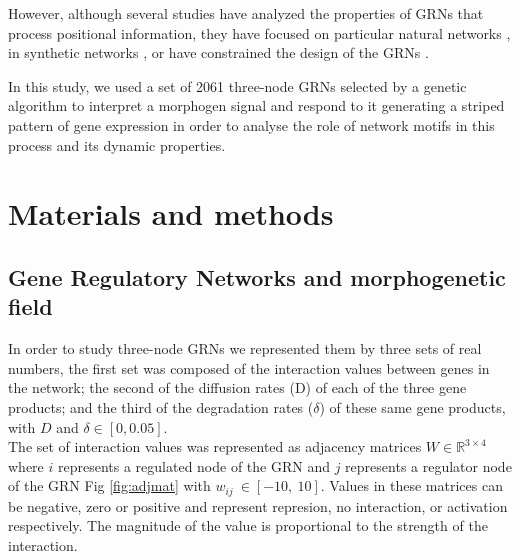 \documentclass[10pt,letterpaper]{article}
\begin{document}
However, although several studies have analyzed the properties of GRNs that
process positional information, they have focused on particular natural networks
\cite{Schaerli2014,Jaeger2004}, in synthetic networks
\cite{Basu2005,Reinitz1995,Schaerli2018}, or have constrained the design of the
GRNs \cite{Elowitz2000}.

In this study, we used a set of 2061 three-node GRNs selected by a genetic
algorithm to interpret a morphogen signal and respond to it generating a
striped pattern of gene expression in order to analyse the role of network 
motifs in this process and its dynamic properties.



\section*{Materials and methods}
\subsection*{Gene Regulatory Networks and morphogenetic field}

In order to study three-node GRNs we represented them by three sets of real 
numbers, the first set was composed of the interaction values
between genes in the network; the second of the diffusion rates (D) of each of 
the three gene products; and the third of the degradation rates ($\delta$) of 
these same gene products, with $D$ and $\delta  \in [0, 0.05]$.\\

The set of interaction values was represented as adjacency matrices $W \in 
\mathbb{R}^{3\times4}$ where $i$ represents a regulated node of the GRN and $j$ 
represents a regulator node of the GRN Fig \ref{fig:adjmat} with 
$w_{\textit{ij}}~\in [-10,\ 10]$. Values in these matrices can be negative, zero
or positive and represent represion, no interaction, or activation respectively.
The magnitude of the value is proportional to the strength of the interaction.\\
\end{document}
